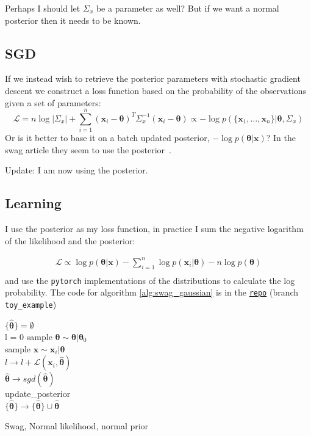 Perhaps I should let $\Sigma_x$ be a parameter as well? But if we want a normal posterior then it needs to be known.



\subsection{SGD}

If we instead wish to retrieve the posterior parameters with stochastic gradient descent we construct a loss function based on the probability of the observations given a set of parameters:
\begin{equation}
  \mathcal{L} = n \log |\Sigma_x| + \displaystyle{\sum_{i=1}^n} (\bm{x}_i - \bm{\theta})^T \Sigma_x^{-1} (\bm{x}_i - \bm{\theta}) \propto - \log p(\{\bm{x}_1, \dots, \bm{x}_n\}| \bm{\theta}, \Sigma_x)
\end{equation}
Or is it better to base it on a batch updated posterior, $-\log p(\bm{\theta}| \bm{x})$? In the swag article they seem to use the posterior~\cite{swag}.

Update: I am now using the posterior.

\subsection{Learning}

I use the posterior as my loss function, in practice I sum the negative logarithm of the likelihood and the posterior:

\begin{align}
  \mathcal{L} \propto \log p( \bm{\theta} | \bm{x} )- \displaystyle{\sum_{i=1}^n} \log p( \bm{x}_i | \bm{\theta} ) - n \log p( \bm{\theta} ) \nonumber \\ 
\end{align}
and use the \texttt{pytorch} implementations of the distributions to calculate the log probability. The code for algorithm \ref{alg:swag_gaussian} is in the
\href{https://github.com/probabilisticdeeplearning/swa_gaussian/tree/toy_example}{\texttt{repo}} (branch \texttt{toy\_example})

\begin{algorithm}

  \Output{$\{\bm{\hat{\theta}}\}$}
  $\{\bm{\hat{\theta}}\} = \emptyset$\\
  {
    {
      l = 0
      {
        sample $\bm{\theta} \sim \bm{\theta} | \bm{\theta}_0$\\
        sample $\bm{x} \sim \bm{x}_i | \bm{\theta}$\\
        $l \to l + \mathcal{L}(\bm{x}_i, \bm{\hat{\theta}})$\\
      }
      $\bm{\hat{\theta}} \to sgd(\bm{\hat{\theta}})$\\
      update\_posterior\\
      $\{\bm{\hat{\theta}}\} \to \{\bm{\hat{\theta}}\} \cup \bm{\hat{\theta}}$
    }
  }
  \caption{Swag, Normal likelihood, normal prior}
  \label{alg:swag_gaussian}
\end{algorithm}
